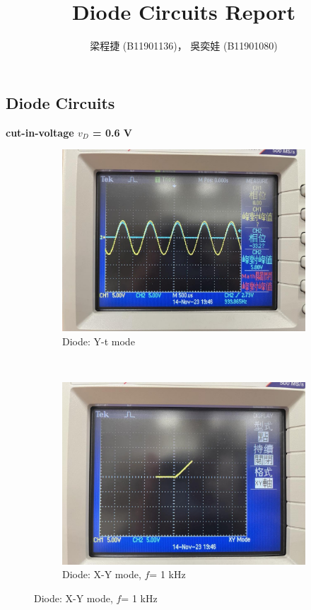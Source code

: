 \documentclass{article}
\title{Diode Circuits Report}
\author{梁程捷 (B11901136)， 吳奕娃 (B11901080)}
\date{}
\begin{document}
\begin{CJK*}{UTF8}{bkai}

\maketitle
\section{Diode Circuits}
\textbf{cut-in-voltage $v_D$ = 0.6 V}
\begin{figure}[h]
    \begin{center}
    
        \begin{subfigure}[b]{0.35\textwidth}
            \includegraphics[width=\textwidth]{diode_yt.jpg}
            \caption{Diode: Y-t mode}
        \end{subfigure}
        ~
        \begin{subfigure}[b]{0.35\textwidth}
            \includegraphics[width=\textwidth]{diode_1k.jpg}
            \caption{Diode: X-Y mode, $f$= 1 k\unit{\hertz}}
        \end{subfigure}
        

\end{center}
\end{figure}
\end{CJK*}
\end{document}
